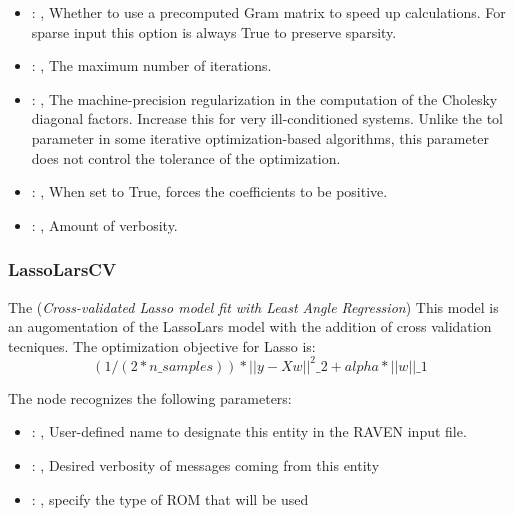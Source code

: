 \begin{itemize}
    \item {}: , 
      Whether to use a precomputed Gram matrix to speed up calculations.
      For sparse input this option is always True to preserve sparsity.

    \item {}: , 
      The maximum number of iterations.

    \item {}: , 
      The machine-precision regularization in the computation of the Cholesky
      diagonal factors. Increase this for very ill-conditioned systems. Unlike the tol
      parameter in some iterative optimization-based algorithms, this parameter does not
      control the tolerance of the optimization.

    \item {}: , 
      When set to True, forces the coefficients to be positive.

    \item {}: , 
      Amount of verbosity.
  \end{itemize}


\subsubsection{LassoLarsCV}
  The  (\textit{Cross-validated Lasso model fit with Least Angle Regression})
  This model is an augomentation of the LassoLars model with the addition of
  cross validation tecniques.                         The optimization objective for Lasso is:
  \begin{equation}                          (1 / (2 * n\_samples)) * ||y - Xw||^2\_2 + alpha *
  ||w||\_1                         \end{equation}

  The  node recognizes the following parameters:
    \begin{itemize}
      \item {}: , 
        User-defined name to designate this entity in the RAVEN input file.
      \item {}: , 
        Desired verbosity of messages coming from this entity
      \item {}: , 
        specify the type of ROM that will be used
  \end{itemize}

